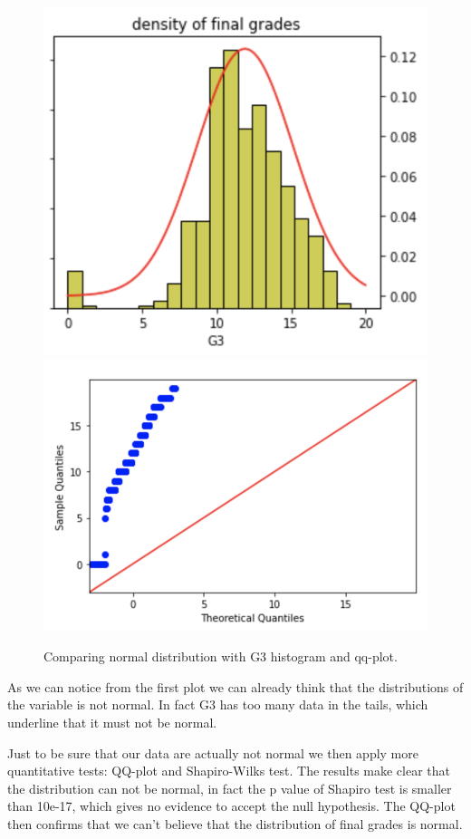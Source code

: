 \documentclass[a4paper, 11pt]{report}
\theoremstyle{definition}
\numberwithin{equation}{section}		%
\numberwithin{table}{section}				%
\begin{document}
\begin{figure}[h]
\centering
\includegraphics[scale=0.5]{G3_distribution.png}
\includegraphics[scale=0.5]{qq-plot_G3.png}
\caption{Comparing normal distribution with G3 histogram and qq-plot.}
\end{figure}

As we can notice from the first plot we can already think that the distributions of the variable is not normal. In fact G3 has too many data in the tails, which underline that it must not be normal.

Just to be sure that our data are actually not normal we then apply more quantitative tests: QQ-plot and Shapiro-Wilks test.
The results make clear that the distribution can not be normal, in fact the p value of Shapiro test is smaller than 10e-17, which gives no evidence to accept the null hypothesis. The QQ-plot then confirms that we can't believe that the distribution of final grades is normal.
\end{document}
